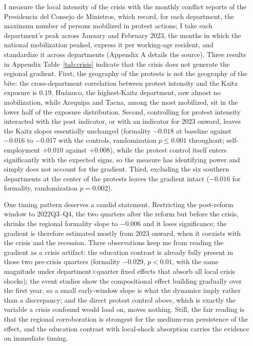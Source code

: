 I measure the local intensity of the crisis with the monthly conflict reports of the
Presidencia del Consejo de Ministros, which record, for each department, the maximum
number of persons mobilized in protest actions; I take each department's peak across
January and February 2023, the months in which the national mobilization peaked,
express it per working-age resident, and standardize it across departments (Appendix
A details the source). Three results in Appendix Table~\ref{tab:crisis} indicate
that the crisis does not generate the regional gradient. First, the geography of the
protests is not the geography of the bite: the cross-department correlation between
protest intensity and the Kaitz exposure is 0.19. Hu\'anuco, the highest-Kaitz
department, saw almost no mobilization, while Arequipa and Tacna, among the most
mobilized, sit in the lower half of the exposure distribution. Second, controlling
for protest intensity interacted with the post indicator, or with an indicator for
2023 onward, leaves the Kaitz slopes essentially unchanged (formality $-0.018$ at
baseline against $-0.016$ to $-0.017$ with the controls, randomization $p \le
0.001$ throughout; self-employment $+0.010$ against $+0.008$), while the protest
control itself enters significantly with the expected signs, so the measure has
identifying power and simply does not account for the gradient. Third, excluding the
six southern departments at the center of the protests leaves the gradient intact
($-0.016$ for formality, randomization $p = 0.002$).

One timing pattern deserves a candid statement. Restricting the post-reform window
to 2022Q3--Q4, the two quarters after the reform but before the crisis, shrinks the
regional formality slope to $-0.006$ and it loses significance; the gradient is
therefore estimated mostly from 2023 onward, when it coexists with the crisis and
the recession. Three observations keep me from reading the gradient as a crisis
artifact: the education contrast is already fully present in those two pre-crisis
quarters (formality $-0.029$, $p<0.01$, with the same magnitude under
department$\times$quarter fixed effects that absorb all local crisis shocks); the
event studies show the compositional effect building gradually over the first year,
so a small early-window slope is what the dynamics imply rather than a discrepancy;
and the direct protest control above, which is exactly the variable a crisis
confound would load on, moves nothing. Still, the fair reading is that the regional
corroboration is strongest for the medium-run persistence of the effect, and the
education contrast with local-shock absorption carries the evidence on immediate
timing.

